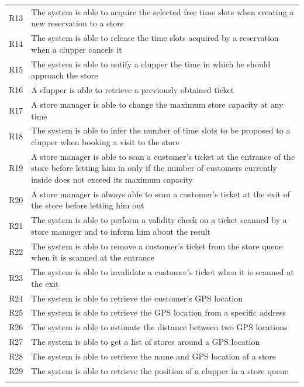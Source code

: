 \documentclass[
]{article}
\begin{document}
\begin{longtable}[]{@{}
  >{\raggedright\arraybackslash}p{}
  >{\raggedright\arraybackslash}p{}@{}}
R13 & The system is able to acquire the selected free time slots when
creating a new reservation to a store \\ \addlinespace
R14 & The system is able to release the time slots acquired by a
reservation when a clupper cancels it \\ \addlinespace
R15 & The system is able to notify a clupper the time in which he should
approach the store \\ \addlinespace
R16 & A clupper is able to retrieve a previously obtained
ticket \\ \addlinespace
R17 & A store manager is able to change the maximum store capacity at
any time \\ \addlinespace
R18 & The system is able to infer the number of time slots to be
proposed to a clupper when booking a visit to the store \\ \addlinespace
R19 & A store manager is able to scan a customer's ticket at the
entrance of the store before letting him in only if the number of
customers currently inside does not exceed its maximum
capacity \\ \addlinespace
R20 & A store manager is always able to scan a customer's ticket at the
exit of the store before letting him out \\ \addlinespace
R21 & The system is able to perform a validity check on a ticket scanned
by a store manager and to inform him about the result \\ \addlinespace
R22 & The system is able to remove a customer's ticket from the store
queue when it is scanned at the entrance \\ \addlinespace
R23 & The system is able to invalidate a customer's ticket when it is
scanned at the exit \\ \addlinespace
R24 & The system is able to retrieve the customer's GPS
location \\ \addlinespace
R25 & The system is able to retrieve the GPS location from a specific
address \\ \addlinespace
R26 & The system is able to estimate the distance between two GPS
locations \\ \addlinespace
R27 & The system is able to get a list of stores around a GPS
location \\ \addlinespace
R28 & The system is able to retrieve the name and GPS location of a
store \\ \addlinespace
R29 & The system is able to retrieve the position of a clupper in a
store queue \\ \addlinespace

\end{longtable}
\end{document}
